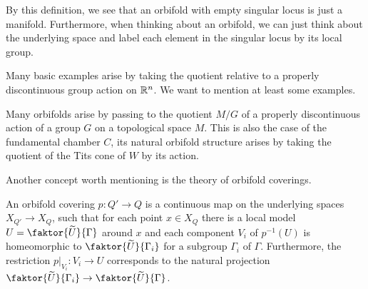 By this definition, we see that an orbifold with empty singular locus is just a manifold.
Furthermore, when thinking about an orbifold, we can just think about the underlying space and label each element in the singular locus by its local group.

Many basic examples arise by taking the quotient relative to a properly discontinuous group action on \(\mathbb{R}^n\).
We want to mention at least some examples.

\begin{example}
\end{example}

Many orbifolds arise by passing to the quotient \(M/G\) of a properly discontinuous action of a group \(G\) on a topological space \(M\).
This is also the case of the fundamental chamber \(C\), its natural orbifold structure arises by taking the quotient of the Tits cone of \(W\) by its action. %

Another concept worth mentioning is the theory of orbifold coverings.

\begin{definition}
    An orbifold covering \(p: Q' \to Q\) is a continuous map on the underlying spaces \(X_{Q'} \to X_Q\), such that for each point \(x \in X_Q\) there is a local model \(U = \faktor{\widetilde{U}}{\Gamma}\) around \(x\) and each component \(V_i\) of \(p^{-1}(U)\) is homeomorphic to \(\faktor{\widetilde{U}}{\Gamma_i}\) for a subgroup \(\Gamma_i\) of \(\Gamma\).
    Furthermore, the restriction \(p\vert_{V_i} : V_i \to U\) corresponds to the natural projection \(\faktor{\widetilde{U}}{\Gamma_i} \to \faktor{\widetilde{U}}{\Gamma}\).
\end{definition}



